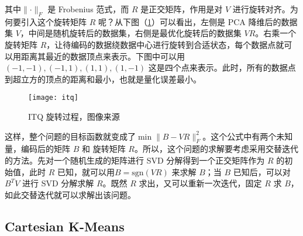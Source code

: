 其中$\lVert \cdot \rVert_F$ 是 Frobenius 范式，而 $R$ 是正交矩阵，作用是对 $V$ 进行旋转对齐。为何要引入这个旋转矩阵 $R$ 呢？从下图（\ref{fig:itq}）可以看出，左侧是 PCA 降维后的数据集 $V$，中间是随机旋转后的数据集，右侧是最优化旋转后的数据集 $VR$。右乘一个旋转矩阵 $R$，让待编码的数据绕数据中心进行旋转到合适状态，每个数据点就可以用距离其最近的数据顶点来表示。下图中可以用 $(-1, -1), (-1, 1), (1, 1), (1, -1) $ 这是四个点来表示。此时，所有的数据点到超立方的顶点的距离和最小，也就是量化误差最小。
\begin{figure}[H]
  \centering
  \texttt{[image: itq]}
  \caption{ITQ 旋转过程，图像来源\cite{YunchaoGong:2011:IQP:2191740.2191779}}
  \label{fig:itq}
\end{figure}
这样，整个问题的目标函数就变成了$\min \lVert B - VR \rVert_F ^2$。这个公式中有两个未知量，编码后的矩阵 $B$ 和 旋转矩阵 $R$。所以，这个问题的求解要考虑采用交替迭代的方法。先对一个随机生成的矩阵进行 SVD 分解得到一个正交矩阵作为 $R$ 的初始值，此时 $R$ 已知，就可以用$ B= \mathrm{sgn}(VR)$ 来求解 $B$；当 $B$ 已知后，可以对 $B^TV$ 进行 SVD 分解求解 $R$。既然 $R$ 求出，又可以重新一次迭代，固定 $R$ 求 $B$，如此交替迭代就可以求解出该问题。
\subsection{Cartesian K-Means}

